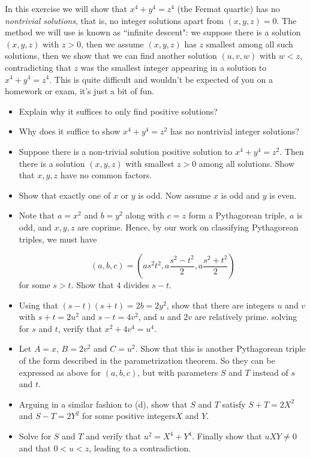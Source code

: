 \documentclass[11pt,dvipsnames]{book}
\numberwithin{equation}{section} %
\numberwithin{figure}{section} %
\numberwithin{table}{section} %
\begin{document}
In this exercise we will show that $x^4 + y^4 = z^4$ (the Fermat quartic) has no {\it nontrivial solutions}, that is, no integer solutions apart from $(x,y,z)=0$. The method we will use is known as ``infinite descent": we suppose there is a solution $(x,y,z)$ with $z>0$, then we assume $(x,y,z)$ has $z$ smallest among all such solutions, then we show that we can find another solution $(u,v,w)$ with $w<z$, contradicting that $z$ was the smallest integer appearing in a solution to $x^4+y^4=z^4$. This is quite difficult and wouldn't be expected of you on a homework or exam, it's just a bit of fun.
\begin{itemize}
\item Explain why it suffices to only find positive solutions?
\item Why does it suffice to show $x^4+y^4=z^2$ has no nontrivial integer solutions?
\item Suppose there is a non-trivial solution positive solution to  $x^4 + y^4 = z^2$. Then there is a solution $(x,y,z)$ with smallest $z>0$ among all solutions. Show that $x,y,z$ have no common factors. 
\item Show that exactly one of $x$ or $y$ is odd. Now assume $x$ is odd and $y$ is even. 
\item Note that $a=x^2$ and $b=y^2$ along with $c=z$ form a Pythagorean triple, $a$ is odd, and $x,y,z$ are coprime.  Hence, by our work on classifying Pythagorean triples, we must have 

\[
(a,b,c) = \left( as^2 t^2, a\frac{s^2-t^2}{2}, a\frac{s^{2}+t^{2}}{2}\right)
\]
for some $s>t$. Show that $4$ divides $s-t$. 
\item Using that $(s-t)(s+t)=2b=2y^2$, show that there are integers $u$ and $v$ with $s+t = 2u^2$ and $s-t=4v^2$, and $u$ and $2v$ are relatively prime. solving for $s$ and $t$, verify that $x^2+4v^4 = u^4$.
\item Let $A = x$, $B = 2v^2$ and $C = u^2$. Show that this is another Pythagorean triple of the form described in the parametrization theorem. So they can be expressed as above for $(a,b,c)$, but with parameters $S$ and $T$ instead of $s$ and $t$.
\item Arguing in a similar fashion to (d), show that $S$ and $T$ satisfy $S+T = 2X^2$ and $S-T=2Y^2$ for some positive integers$ X$ and $Y$.
\item Solve for $S$ and $T$ and verify that $u^2 = X^4 + Y^4$. Finally show that $uXY\neq 0$ and that $0 < u < z$, leading to a contradiction.
\end{itemize}  
\end{document}

